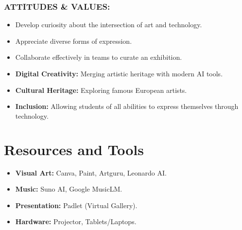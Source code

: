 \documentclass[11pt, a4paper]{article}
\begin{document}
\subsubsection*{ATTITUDES \& VALUES:}
\begin{itemize}
    \item Develop curiosity about the intersection of art and technology.
    \item Appreciate diverse forms of expression.
    \item Collaborate effectively in teams to curate an exhibition.
\end{itemize}

\begin{eurobox}
\begin{itemize}
    \item \textbf{Digital Creativity:} Merging artistic heritage with modern AI tools.
    \item \textbf{Cultural Heritage:} Exploring famous European artists.
    \item \textbf{Inclusion:} Allowing students of all abilities to express themselves through technology.
\end{itemize}
\end{eurobox}

\newpage
\section{Resources and Tools}
\begin{itemize}
    \item \textbf{Visual Art:} Canva, Paint, Artguru, Leonardo AI.
    \item \textbf{Music:} Suno AI, Google MusicLM.
    \item \textbf{Presentation:} Padlet (Virtual Gallery).
    \item \textbf{Hardware:} Projector, Tablets/Laptops.
\end{itemize}
\end{document}
